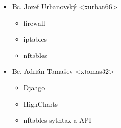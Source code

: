 	\begin{itemize}
		\item Bc. Jozef Urbanovský <xurban66>
		\begin{itemize}
			\item firewall
			\item iptables
			\item nftables
		\end{itemize}
	
		\item Bc. Adrián Tomašov <xtomas32>
		\begin{itemize}
			\item Django
			\item HighCharts
			\item nftables sytntax a API
		\end{itemize}
		
	\end{itemize}
	

